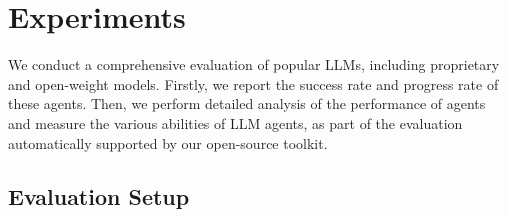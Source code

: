 






\section{Experiments}
\label{sec:exp}

We conduct a comprehensive evaluation of popular LLMs, including proprietary and open-weight models. Firstly, we report the success rate and progress rate of these agents. Then, we perform detailed analysis of the performance of agents and measure the various abilities of LLM agents, as part of the \BenchName{} evaluation automatically supported by our open-source toolkit.

\subsection{Evaluation Setup}




